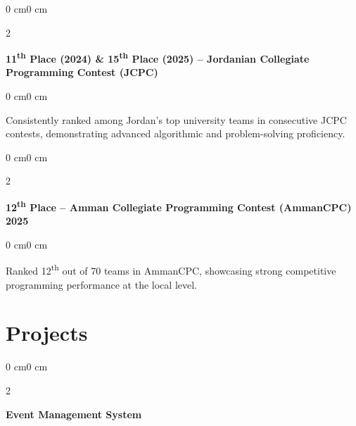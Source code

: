 \documentclass[10pt, letterpaper]{article}
\newenvironment{onecolentry}{
    \begin{adjustwidth}{0 cm}{0 cm}
}{
    \end{adjustwidth}
}
\newenvironment{twocolentry}[2][]{
    \onecolentry
    \def\secondColumn{#2}
    \setcolumnwidth{\fill, 4.5 cm}
    \begin{paracol}{2}
}{
    \switchcolumn \raggedleft \secondColumn
    \end{paracol}
    \endonecolentry
}
\begin{document}
        \vspace{0.2 cm}
        
        \begin{twocolentry}{}
            \textbf{11\textsuperscript{th} Place (2024) \& 15\textsuperscript{th} Place (2025) -- Jordanian Collegiate Programming Contest (JCPC)}
        \end{twocolentry}
        \begin{onecolentry}
            Consistently ranked among Jordan’s top university teams in consecutive JCPC contests, demonstrating advanced algorithmic and problem-solving proficiency.
        \end{onecolentry}

\vspace{0.2 cm}

\begin{twocolentry}{}
    \textbf{12\textsuperscript{th} Place -- Amman Collegiate Programming Contest (AmmanCPC) 2025}
\end{twocolentry}
\begin{onecolentry}
    Ranked 12\textsuperscript{th} out of 70 teams in AmmanCPC, showcasing strong competitive programming performance at the local level.
\end{onecolentry}


        \vspace{0.5cm}

     \section{Projects}
        \vspace{0.2cm}
        
        \begin{twocolentry}{}
            \textbf{Event Management System}
        \end{twocolentry}
        
\end{document}
